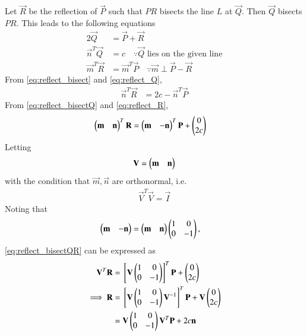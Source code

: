 \begin{enumerate}[label=\thesubsection.\arabic*.,ref=\thesubsection.\theenumi]
Let $\vec{R}$ be the reflection of $\vec{P}$ such that $PR$ bisects the line $L$ at $\vec{Q}$. Then $\vec{Q}$ bisects $PR$.  
This leads to the following equations
\begin{align}
\label{eq:reflect_bisect}
2\vec{Q} &= \vec{P}+\vec{R}
\\
\label{eq:reflect_Q}
\vec{n}^{T}\vec{Q} &= c \quad \because \vec{Q} \text{ lies on the given line}
\\
\label{eq:reflect_R}
\vec{m}^{T}\vec{R} &= \vec{m}^{T}\vec{P} \quad \because \vec{m}\perp \vec{P} - \vec{R}
\end{align}
%
From \eqref{eq:reflect_bisect} and \eqref{eq:reflect_Q},
\begin{align}
\label{eq:reflect_bisectQ}
\vec{n}^{T}\vec{R}  &= 2c - \vec{n}^{T}\vec{P}
\end{align}
%
From \eqref{eq:reflect_bisectQ} and \eqref{eq:reflect_R},
\begin{align}
\label{eq:reflect_bisectQR}
\begin{pmatrix}\mathbf{m} & \mathbf{n}\end{pmatrix}^T\mathbf{R} &= \begin{pmatrix}\mathbf{m} & -\mathbf{n}\end{pmatrix}^T\mathbf{P}+ \begin{pmatrix}0 \\ 2c\end{pmatrix}
\end{align}
%
Letting 
\begin{align}
\label{eq:reflect_mat}
\mathbf{V}=  \begin{pmatrix}\mathbf{m} & \mathbf{n}\end{pmatrix}
\end{align}
with the condition that $\vec{m},\vec{n}$ are orthonormal, i.e.
\begin{align}
\label{eq:reflect_ortho}
\vec{V}^T\vec{V}=  \vec{I}
\end{align}
%
Noting that 
\begin{align}
\label{eq:reflect_trans}
\begin{pmatrix}\mathbf{m} & -\mathbf{n}\end{pmatrix} &= \begin{pmatrix}\mathbf{m} & \mathbf{n}\end{pmatrix} \begin{pmatrix}1 & 0 \\ 0 & -1\end{pmatrix},
\end{align}
\eqref{eq:reflect_bisectQR} can be expressed as
%
\begin{align}
\label{eq:reflect_}
\mathbf{V}^T\mathbf{R} &=  {}\left[\mathbf{V}\begin{pmatrix}1 & 0 \\ 0 & -1\end{pmatrix}\right]^T\mathbf{P}+\begin{pmatrix}0 \\ 2c\end{pmatrix}
\\
\implies \mathbf{R} &= {}\left[\mathbf{V}\begin{pmatrix}1 & 0 \\ 0 & -1\end{pmatrix}\mathbf{V}^{-1}\right]^T\mathbf{P}+ \mathbf{V}\begin{pmatrix}0 \\ 2c\end{pmatrix}
\\
 &=\mathbf{V}\begin{pmatrix}1 & 0 \\ 0 & -1\end{pmatrix}\mathbf{V}^T \mathbf{P}+2c \mathbf{n}
\label{eq:reflect_mat_final}
\end{align}

\end{enumerate}

